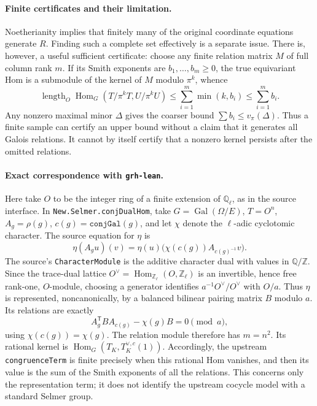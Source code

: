 \paragraph{Finite certificates and their limitation.}
Noetherianity implies that finitely many of the original coordinate equations
generate $R$. Finding such a complete set effectively is a separate issue.
There is, however, a useful sufficient certificate: choose any finite relation
matrix $M$ of full column rank $m$. If its Smith exponents are
$b_1,\ldots,b_m\geq0$, the true equivariant Hom is a submodule of the kernel
of $M$ modulo $\pi^k$, whence
\[
 \operatorname{length}_O\operatorname{Hom}_G(T/\pi^kT,U/\pi^kU)
 \leq\sum_{i=1}^m\min(k,b_i)\leq\sum_{i=1}^m b_i.
\]
Any nonzero maximal minor $\Delta$ gives the coarser bound
$\sum b_i\leq v_\pi(\Delta)$. Thus a finite sample can certify an upper
bound without a claim that it generates all Galois relations. It cannot by
itself certify that a nonzero kernel persists after the omitted relations.

\paragraph{Exact correspondence with \texttt{grh-lean}.}
Here take $O$ to be the integer ring of a finite extension of
$\mathbb Q_\ell$, as in the source interface.
In \texttt{New.Selmer.conjDualHom}, take $G=\operatorname{Gal}(\Omega/E)$,
$T=O^n$, $A_g=\rho(g)$, $c(g)=\texttt{conjGal}(g)$, and let $\chi$ denote
the $\ell$-adic cyclotomic character. The source equation for $\eta$ is
\[
 \eta(A_g u)(v)=\eta(u)\bigl(\chi(c(g))A_{c(g)^{-1}}v\bigr).
\]
The source's \texttt{CharacterModule} is the additive character dual with
values in $\mathbb Q/\mathbb Z$. Since the trace-dual lattice
$O^\vee=\operatorname{Hom}_{\mathbb Z_\ell}(O,\mathbb Z_\ell)$ is an
invertible, hence free rank-one, $O$-module, choosing a generator identifies
$a^{-1}O^\vee/O^\vee$ with $O/a$. Thus $\eta$ is represented, noncanonically,
by a balanced bilinear pairing matrix $B$ modulo $a$. Its relations are
exactly
\begin{equation}
 A_g^{\mathsf T}B A_{c(g)}-\chi(g)B=0\pmod a,
 \label{eq:conj-dual-relations}
\end{equation}
using $\chi(c(g))=\chi(g)$. The relation module therefore has $m=n^2$.
Its rational kernel is
$\operatorname{Hom}_G(T_K,T_K^{\vee,c}(1))$.
Accordingly, the upstream \texttt{congruenceTerm} is finite precisely when
this rational Hom vanishes, and then its value is the sum of the Smith
exponents of all the relations. This concerns only the representation term;
it does not identify the upstream cocycle model with a standard Selmer group.

